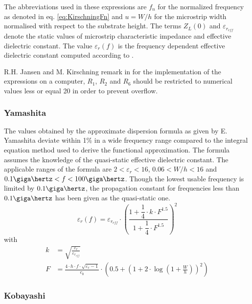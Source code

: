 The abbreviations used in these expressions are $f_n$ for the
normalized frequency as denoted in eq. \eqref{eq:KirschningFn} and $u
= W/h$ for the microstrip width normalised with respect to the
substrate height.  The terms $Z_L(0)$ and $\varepsilon_{r_{eff}}$
denote the static values of microstrip characteristic impedance and
effective dielectric constant.  The value $\varepsilon_{r}(f)$ is the
frequency dependent effective dielectric constant computed according
to \cite{Kirschning3}.

\addvspace{12pt}

R.H. Jansen and M. Kirschning remark in \cite{Kirschning1} for the
implementation of the expressions on a computer, $R_1$, $R_2$ and
$R_6$ should be restricted to numerical values less or equal 20 in
order to prevent overflow.

\subsubsection{Yamashita}

The values obtained by the approximate dispersion formula as given by
E. Yamashita \cite{Yamashita} deviate within 1\% in a wide frequency
range compared to the integral equation method used to derive the
functional approximation.  The formula assumes the knowledge of the
quasi-static effective dielectric constant.  The applicable ranges of
the formula are $2 < \varepsilon_r < 16$, $0.06 < W/h < 16$ and
$0.1\giga\hertz < f < 100\giga\hertz$.  Though the lowest usable
frequency is limited by $0.1\giga\hertz$, the propagation constant for
frequencies less than $0.1\giga\hertz$ has been given as the
quasi-static one.
\begin{equation}
\varepsilon_{r}(f) = \varepsilon_{r_{eff}}\cdot \left(\frac{1 + \dfrac{1}{4}\cdot k\cdot F^{1.5}}{1 + \dfrac{1}{4}\cdot F^{1.5}}\right)^{2}
\end{equation}
with
\begin{align}
k &= \sqrt{\frac{\varepsilon_{r}}{\varepsilon_{r_{eff}}}}\\
F &= \frac{4\cdot h\cdot f\cdot \sqrt{\varepsilon_{r} - 1}}{c_{0}} \cdot \left(0.5 + \left(1 + 2 \cdot \log\left(1 + \frac{W}{h}\right)\right)^{2}\right)
\end{align}

\subsubsection{Kobayashi}

